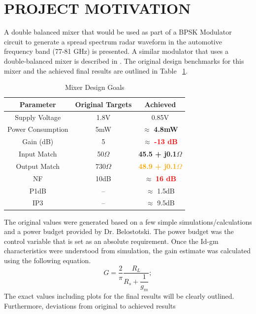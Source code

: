 \documentclass{article}                                                         %
\begin{document}
\section{PROJECT MOTIVATION}
A double balanced mixer that would be used as part of a  BPSK Modulator circuit
to generate a spread spectrum radar waveform in the automotive frequency band (77-81 GHz) is presented. A similar modulator
that uses a double-balanced mixer is described in \cite{schleicher2010biphase}. The original design benchmarks for this mixer
and the achieved final results are outlined in Table ~\ref{table:goalsnresults}.\vspace{3mm}
\vspace{3mm}
\begin{table}[H]
\centering
 \begin{tabular}{ | c | c | c |}
   \hline
    \textbf{Parameter} & \textbf{Original Targets} & \textbf{Achieved}  \\
    \hline
    \hline
    Supply Voltage & 1.8V & 0.85V \\
    \hline
    Power Consumption & 5mW & $\approx$ \textbf{\textcolor{OliveGreen}{4.8mW}}\\
    \hline
    Gain (dB)   & 5 & $\approx$ \textbf{\textcolor{Red}{-13 dB}} \\
    \hline
    Input Match  & 50$\Omega$ & \textbf{\textcolor{OliveGreen}{45.5 + j0.1$\Omega$}} \\
    \hline
    Output Match & 730$\Omega$ & \textbf{\textcolor{Orange}{48.9 + j0.1$\Omega$}}\\
    \hline
    NF & 10dB & $\approx$ \textbf{\textcolor{Red}{16 dB}}\\
    \hline
    P1dB & -- & $\approx$ 1.5dB  \\
    \hline
    IP3 & -- & $\approx$ 9.5dB  \\
    \hline
  \end{tabular}
  \caption{Mixer Design Goals}
  \label{table:goalsnresults}
\end{table}
The original values were generated based on a few simple simulations/calculations and a power budget provided by Dr. Belostotski. The
power budget was the control variable that is set as an absolute requirement.  Once the Id-gm
characteristics were understood from simulation, the gain estimate was calculated using the following equation.
\begin{equation}
  \label{eq:idealgain}
  G=\dfrac{2}{\pi}\dfrac{R_L}{R_s + \dfrac{1}{g_m}};
\end{equation}
The exact values including plots for the final results will be clearly outlined. Furthermore, deviations from original to achieved results
\end{document}
